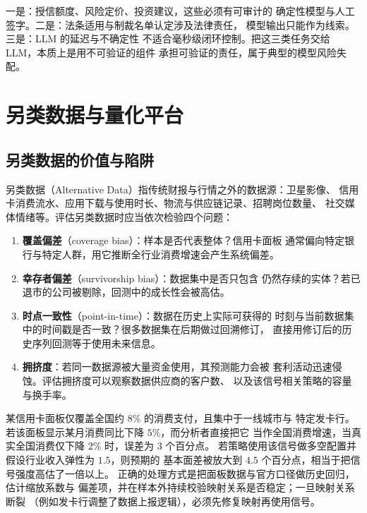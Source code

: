 \begin{warningbox}[不能交给大语言模型的三类任务]
一是：授信额度、风险定价、投资建议，这些必须有可审计的
确定性模型与人工签字。二是：法条适用与制裁名单认定涉及法律责任，
模型输出只能作为线索。三是：LLM 的延迟与不确定性
不适合毫秒级闭环控制。把这三类任务交给 LLM，本质上是用不可验证的组件
承担可验证的责任，属于典型的模型风险失配。
\end{warningbox}

\section{另类数据与量化平台}

\subsection{另类数据的价值与陷阱}

另类数据（Alternative Data）指传统财报与行情之外的数据源：卫星影像、
信用卡消费流水、应用下载与使用时长、物流与供应链记录、招聘岗位数量、
社交媒体情绪等。评估另类数据时应当依次检验四个问题：

\begin{enumerate}[leftmargin=*]
  \item \textbf{覆盖偏差}（coverage bias）：样本是否代表整体？信用卡面板
        通常偏向特定银行与特定人群，用它推断全行业消费增速会产生系统偏差。
  \item \textbf{幸存者偏差}（survivorship bias）：数据集中是否只包含
        仍然存续的实体？若已退市的公司被剔除，回测中的成长性会被高估。
  \item \textbf{时点一致性}（point-in-time）：数据在历史上实际可获得的
        时刻与当前数据集中的时间戳是否一致？很多数据集在后期做过回溯修订，
        直接用修订后的历史序列回测等于使用未来信息。
  \item \textbf{拥挤度}：若同一数据源被大量资金使用，其预测能力会被
        套利活动迅速侵蚀。评估拥挤度可以观察数据供应商的客户数、
        以及该信号相关策略的容量与换手率。
\end{enumerate}

\begin{example}[覆盖率外推的偏差量级]\label{ex:02-coverage}
某信用卡面板仅覆盖全国约 $8\%$ 的消费支付，且集中于一线城市与
特定发卡行。若该面板显示某月消费同比下降 $5\%$，而分析者直接把它
当作全国消费增速，当真实全国消费仅下降 $2\%$ 时，误差为 $3$ 个百分点。
若策略使用该信号做多空配置并假设行业收入弹性为 $1.5$，则预期的
基本面差被放大到 $4.5$ 个百分点，相当于把信号强度高估了一倍以上。
正确的处理方式是把面板数据与官方口径做历史回归，估计缩放系数与
偏差项，并在样本外持续校验映射关系是否稳定；一旦映射关系断裂
（例如发卡行调整了数据上报逻辑），必须先修复映射再使用信号。
\end{example}

